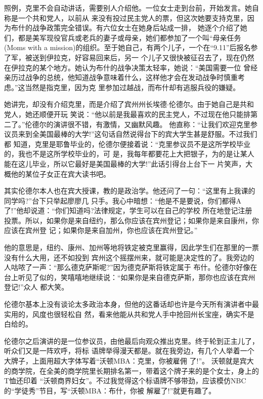 ﻿\documentclass[11pt]{article}
\begin{document}
照例，克里不会自动讲话，需要别人介绍他。一位女士走到台前，开始发言。她自称是一个共和党人，以前从
来没有投过民主党人的票，但这次她要支持克里，因为布什的战争政策完全错误。有六位女士在她身后站成一排，
她逐个介绍了她们，都是美军现役官兵或老兵的妻子或母亲，她们都参加了一个叫``母亲任务(Moms with a
mission)的组织。至于她自己，有两个儿子，一个在``9.11''后报名参了军，被送到伊拉克，好容易回来后，另一
个儿子又很快被征召去了，现在仍然在伊拉克的某个地方。她认为布什的战争决策太轻率，她说：``美国需要一位
曾经亲历过战争的总统，他知道战争意味着什么，这样他才会在发动战争时慎重考虑。''这当然是指克里，因为克
里参加过越战，而布什却有逃服兵役的嫌疑。

她讲完，却没有介绍克里，而是介绍了宾州州长埃德$\cdot$伦德尔。由于她自己是共和党人，她还顺便开玩
笑说：``他以前是我最喜欢的民主党人，不过现在他只能排第二了。''伦德尔的演讲很不错，有激情，又幽默风趣。
他直称：``让我们欢迎克里参议员来到全美国最棒的大学!''这句话自然说得台下的宾大学生甚是舒服。不过我们都
知道，克里是耶鲁毕业的，伦德尔便接着说：``克里参议员不是这所学校毕业的，我也不是这所学校毕业的，可
是，我每年都要花上大把银子，为的是让某人能在这儿毕业，所以它最好是美国最棒的大学!''此话引得台上台下一
片笑声，大概他的某位子女正在宾大读书吧。

其实伦德尔本人也在宾大授课，教的是政治学。他还问了一句：``这里有上我课的同学吗?''台下只举起廖廖几
只手。我心中暗想：``他是不是要说，你们都得A了!''他却说道：``你们知道吗?法律规定，学生可以在自己的学校
所在地登记注册投票。所以，如果你是来自纽约，那么你应该在宾州登记；如果你是来自康州，你应该在宾州登
记；如果你是来自加州，你也应该在宾州登记。''

他的意思是，纽约、康州、加州等地将铁定被克里赢得，因此学生们在那里的一票没有什么大用，还不如投到
宾州这个摇摆州来，就可能是决定性的了。我旁边的人咕哝了一声：``那么德克萨斯呢?''因为德克萨斯将铁定属于
布什。伦德尔好像在台上听见了似的，笑嘻嘻地继续说：``如果你是来自德克萨斯，那你也应该在宾州登记!''众人
都大笑。

伦德尔基本上没有谈论太多政治本身，但他的这番话却也许是今天所有演讲者中最实用的，风度也很轻松自
然，看来他能从共和党人手中抢回州长宝座，确实不是白给的。

伦德尔之后演讲的是一位参议员，由他最后向观众推出克里。终于轮到正主儿了，听众们又是一阵欢呼，将标
语牌举得漫天都是。就在我旁边，有几个人举着一个大牌子，上面用超大字体写着``沃顿MBA：克里，你被雇佣
了!''。 沃顿就是宾大的商学院，在全美的商学院里长期排名第一，带着这个牌子来的是个女士，身上的T恤还印着
``沃顿商界妇女''。不过我觉得这个标语牌不够带劲，应该模仿NBC的``学徒秀''节目，写``沃顿MBA：布什，你被
解雇了!''就更有趣了。
\end{document}
